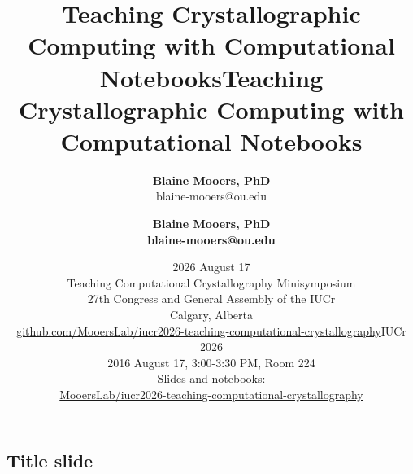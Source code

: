 \newcommand{\bi}{\begin{itemize}[font=$\bullet$\scshape\bfseries]}
\newcommand{\ei}{\end{itemize}}
\newcommand{\ig}{\includegraphics}
\newcommand{\subt}[1]{{\footnotesize \color{subtitle} {#1}}}

\usepackage{latexsym} %
\newenvironment{checklist}{%
  \begin{list}{}{}%
  \let\olditem\item
  \renewcommand\item{\olditem[$\Box$] }
}{%
  \end{list}
}




\newcommand{\figph}[2][0.72\linewidth]{%
  \setlength{\fboxsep}{0pt}%
  \begin{center}%
  \fcolorbox{gray!60}{gray!12}{%
    \parbox[c][3.4cm][c]{#1}{\centering\itshape\small
      [Figure placeholder]\\[2pt]#2}}%
  \end{center}%
}

\title[]{Teaching Crystallographic Computing with Computational Notebooks}
\author{\textbf{Blaine Mooers, PhD} \\ blaine-mooers@ou.edu }
\date{2026 August 17 \\ Teaching Computational Crystallography Minisymposium\\ 27th Congress and General Assembly of the IUCr\\ Calgary, Alberta \\ \url{github.com/MooersLab/iucr2026-teaching-computational-crystallography}}

\subsection{Title slide}

\title{Teaching Crystallographic Computing with Computational Notebooks}
\author{\textbf{Blaine Mooers, PhD \\ blaine-mooers@ou.edu}}
\date{IUCr 2026 \\ 2016 August 17, 3:00-3:30 PM, Room 224 \\  \vfill  Slides and notebooks: \\ \url{MooersLab/iucr2026-teaching-computational-crystallography}}


